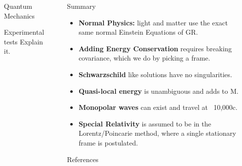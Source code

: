 \documentclass[final]{beamer}
\newlength{\sepwidth}
\newlength{\colwidth}
\newcommand{\separatorcolumn}{\begin{column}{\sepwidth}\end{column}}
\begin{document}
\begin{frame}[t]
\begin{columns}[t]
\begin{column}{\colwidth}
\begin{block}{Quantum Mechanics}
\begin{exampleblock}{Experimental tests}
Explain it.
\end{exampleblock} 
   
\end{block}



\end{column}
\separatorcolumn

\begin{column}{\colwidth}

  \begin{alertblock}{Summary}
    \begin{itemize}
      \item \textbf{Normal Physics:} light and matter use the exact same normal Einstein Equations of GR.
      \item \textbf{Adding Energy Conservation} requires breaking covariance, which we do by picking a frame.
      \item \textbf{Schwarzschild} like solutions have no singularities.
       \item \textbf{Quasi-local energy} is unambiguous and adds to M.
       \item \textbf{Monopolar waves} can exist and travel at ~10,000c.
       \item \textbf{Special Relativity} is assumed to be in the Lorentz/Poincarie method, where a single stationary frame is postulated.
       
    \end{itemize}
  \end{alertblock}

\begin{block}{References}
\printbibliography
\end{block}

\end{column}


\separatorcolumn
\end{columns}
\end{frame}
\end{document}
